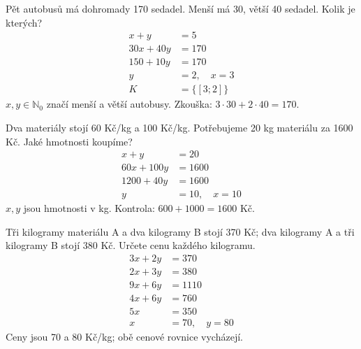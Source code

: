\documentclass[11pt,a4paper]{article}
\begin{document}
\begin{zadaniReseniBox}[title={Samostatná práce 2}]
Pět autobusů má dohromady 170 sedadel. Menší má 30, větší 40 sedadel. Kolik je kterých?
\tcblower
\[\begin{aligned}
x+y&=5 \\
30x+40y&=170 \\
150+10y&=170 \\
y&=2,\quad x=3 \\
K&=\{[3;2]\}
\end{aligned}\]
$x,y\in\mathbb N_0$ značí menší a větší autobusy. Zkouška: $3\cdot30+2\cdot40=170$.
\end{zadaniReseniBox}
\begin{zadaniReseniBox}[title={Samostatná práce 3}]
Dva materiály stojí 60 Kč/kg a 100 Kč/kg. Potřebujeme 20 kg materiálu za 1600 Kč. Jaké hmotnosti koupíme?
\tcblower
\[\begin{aligned}
x+y&=20 \\
60x+100y&=1600 \\
1200+40y&=1600 \\
y&=10,\quad x=10
\end{aligned}\]
$x,y$ jsou hmotnosti v kg. Kontrola: $600+1000=1600$ Kč.
\end{zadaniReseniBox}
\begin{zadaniReseniBox}[title={Rozšíření 1}]
Tři kilogramy materiálu A a dva kilogramy B stojí 370 Kč; dva kilogramy A a tři kilogramy B stojí 380 Kč. Určete cenu každého kilogramu.
\tcblower
\[\begin{aligned}
3x+2y&=370 \\
2x+3y&=380 \\
9x+6y&=1110 \\
4x+6y&=760 \\
5x&=350 \\
x&=70,\quad y=80
\end{aligned}\]
Ceny jsou 70 a 80 Kč/kg; obě cenové rovnice vycházejí.
\end{zadaniReseniBox}
\end{document}
